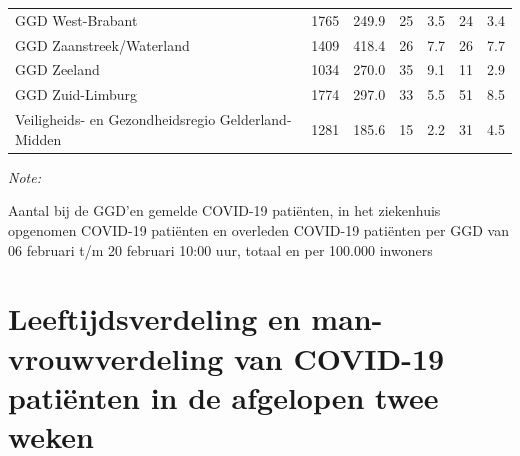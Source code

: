 \documentclass[
  english,
  man,floatsintext]{apa6}
\begin{document}
\begin{table}[H]
\begin{threeparttable}
\begin{tabular}{lrrrrrr}
GGD West-Brabant & 1765 & 249.9 & 25 & 3.5 & 24 & 3.4\\
GGD Zaanstreek/Waterland & 1409 & 418.4 & 26 & 7.7 & 26 & 7.7\\
GGD Zeeland & 1034 & 270.0 & 35 & 9.1 & 11 & 2.9\\
GGD Zuid-Limburg & 1774 & 297.0 & 33 & 5.5 & 51 & 8.5\\
Veiligheids- en Gezondheidsregio Gelderland-Midden & 1281 & 185.6 & 15 & 2.2 & 31 & 4.5\\
\bottomrule
\end{tabular}
\begin{tablenotes}
\item \textit{Note: } 
\item Aantal bij de GGD’en gemelde COVID-19 patiënten, in het ziekenhuis opgenomen COVID-19 patiënten en overleden COVID-19 patiënten per GGD van 06 februari t/m 20 februari 10:00 uur, totaal en per 100.000 inwoners
\end{tablenotes}
\end{threeparttable}
\endgroup{}
\end{table}

\newpage

\hypertarget{leeftijdsverdeling-en-man-vrouwverdeling-van-covid-19-patiuxebnten-in-de-afgelopen-twee-weken}{%
\section{Leeftijdsverdeling en man-vrouwverdeling van COVID-19 patiënten in de afgelopen twee weken}\label{leeftijdsverdeling-en-man-vrouwverdeling-van-covid-19-patiuxebnten-in-de-afgelopen-twee-weken}}
\end{document}
